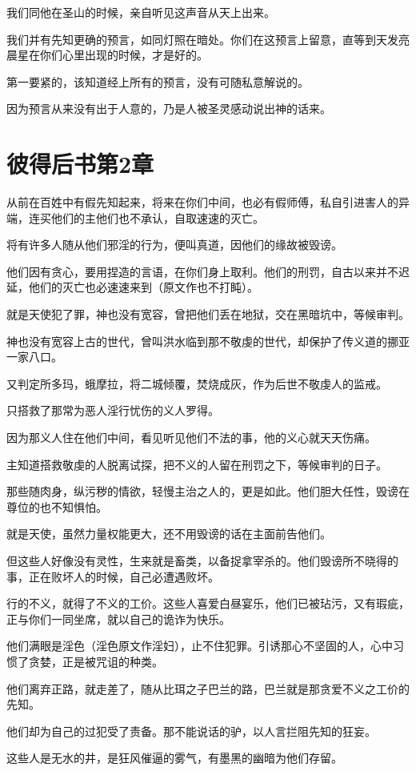 \documentclass[12pt,oneside]{book}
\begin{document}
我们同他在圣山的时候，亲自听见这声音从天上出来。

我们并有先知更确的预言，如同灯照在暗处。你们在这预言上留意，直等到天发亮晨星在你们心里出现的时候，才是好的。

第一要紧的，该知道经上所有的预言，没有可随私意解说的。

因为预言从来没有出于人意的，乃是人被圣灵感动说出神的话来。

\chapter{彼得后书第2章}
从前在百姓中有假先知起来，将来在你们中间，也必有假师傅，私自引进害人的异端，连买他们的主他们也不承认，自取速速的灭亡。

将有许多人随从他们邪淫的行为，便叫真道，因他们的缘故被毁谤。

他们因有贪心，要用捏造的言语，在你们身上取利。他们的刑罚，自古以来并不迟延，他们的灭亡也必速速来到（原文作也不打盹）。

就是天使犯了罪，神也没有宽容，曾把他们丢在地狱，交在黑暗坑中，等候审判。

神也没有宽容上古的世代，曾叫洪水临到那不敬虔的世代，却保护了传义道的挪亚一家八口。

又判定所多玛，蛾摩拉，将二城倾覆，焚烧成灰，作为后世不敬虔人的监戒。

只搭救了那常为恶人淫行忧伤的义人罗得。

因为那义人住在他们中间，看见听见他们不法的事，他的义心就天天伤痛。

主知道搭救敬虔的人脱离试探，把不义的人留在刑罚之下，等候审判的日子。

那些随肉身，纵污秽的情欲，轻慢主治之人的，更是如此。他们胆大任性，毁谤在尊位的也不知惧怕。

就是天使，虽然力量权能更大，还不用毁谤的话在主面前告他们。

但这些人好像没有灵性，生来就是畜类，以备捉拿宰杀的。他们毁谤所不晓得的事，正在败坏人的时候，自己必遭遇败坏。

行的不义，就得了不义的工价。这些人喜爱白昼宴乐，他们已被玷污，又有瑕疵，正与你们一同坐席，就以自己的诡诈为快乐。

他们满眼是淫色（淫色原文作淫妇），止不住犯罪。引诱那心不坚固的人，心中习惯了贪婪，正是被咒诅的种类。

他们离弃正路，就走差了，随从比珥之子巴兰的路，巴兰就是那贪爱不义之工价的先知。

他们却为自己的过犯受了责备。那不能说话的驴，以人言拦阻先知的狂妄。

这些人是无水的井，是狂风催逼的雾气，有墨黑的幽暗为他们存留。
\end{document}
